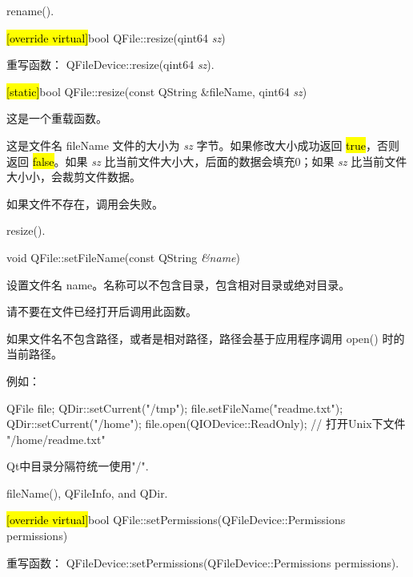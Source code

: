 \begin{seeAlso}
rename().
\end{seeAlso}

\hl{[override virtual]}bool QFile::resize(qint64 \emph{sz})

重写函数： QFileDevice::resize(qint64 \emph{sz}).

\hl{[static]}bool QFile::resize(const QString \&fileName, qint64 \emph{sz})

这是一个重载函数。

这是文件名 fileName 文件的大小为 \emph{sz} 字节。如果修改大小成功返回 \hl{true}，否则返回 \hl{false}。如果 \emph{sz} 比当前文件大小大，后面的数据会填充0；如果 \emph{sz} 比当前文件大小小，会裁剪文件数据。



\begin{warning}
如果文件不存在，调用会失败。
\end{warning}

\begin{seeAlso}
resize().
\end{seeAlso}

void QFile::setFileName(const QString \emph{\&name})

设置文件名 name。名称可以不包含目录，包含相对目录或绝对目录。

请不要在文件已经打开后调用此函数。

如果文件名不包含路径，或者是相对路径，路径会基于应用程序调用 open() 时的当前路径。

例如：

\begin{cppcode}
QFile file;
QDir::setCurrent("/tmp");
file.setFileName("readme.txt");
QDir::setCurrent("/home");
file.open(QIODevice::ReadOnly);      // 打开Unix下文件 "/home/readme.txt"
\end{cppcode}



\begin{notice}
Qt中目录分隔符统一使用"/".
\end{notice}

\begin{seeAlso}
fileName(), QFileInfo, and QDir.
\end{seeAlso}

\splitLine

\hl{[override virtual]}bool QFile::setPermissions(QFileDevice::Permissions permissions)

重写函数： QFileDevice::setPermissions(QFileDevice::Permissions permissions).

